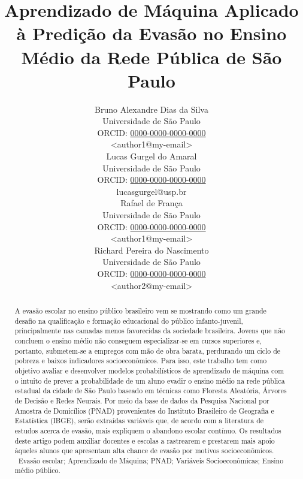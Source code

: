 \documentclass[english, spanish, brazilian]{RBIEarticle} %
\title{Aprendizado de Máquina Aplicado à Predição da Evasão no Ensino Médio da Rede Pública de São Paulo}
\author{%
	\parbox{3.8cm}{%
		Bruno Alexandre Dias da Silva\\
		Universidade de São Paulo\\
		ORCID: \href{https://orcid.org/0000-0000-0000-0000}{0000-0000-0000-0000}\\
		<author1@my-email>
	}
        \hspace{0.3cm}
	\parbox{3.8cm}{%
		Lucas Gurgel do Amaral\\
		Universidade de São Paulo\\
		ORCID: \href{https://orcid.org/0000-0000-0000-0000}{0000-0000-0000-0000}\\
		lucasgurgel@usp.br
	}
        \hspace{0.3cm}
        \parbox{3.8cm}{%
		Rafael de França\\
		Universidade de São Paulo\\
		ORCID: \href{https://orcid.org/0000-0000-0000-0000}{0000-0000-0000-0000}\\
		<author1@my-email>
	}
        \hspace{0.3cm}
	\parbox{3.9cm}{\raggedright%
		Richard Pereira do Nascimento\\
		Universidade de São Paulo\\
		ORCID: \href{https://orcid.org/0000-0000-0000-0000}{0000-0000-0000-0000}\\
		<author2@my-email>
	}
}
\begin{document}
\maketitle

\begin{otherlanguage}{brazilian}
\begin{abstract}
A evasão escolar no ensino público brasileiro vem se mostrando como um grande desafio na qualificação e formação educacional do público infanto-juvenil, principalmente nas camadas menos favorecidas da sociedade brasileira. Jovens que não concluem o ensino médio não conseguem especializar-se em cursos superiores e, portanto, submetem-se a empregos com mão de obra barata, perdurando um ciclo de pobreza e baixos indicadores socioeconômicos. Para isso, este trabalho tem como objetivo avaliar e desenvolver modelos probabilísticos de aprendizado de máquina com o intuito de prever a probabilidade de um aluno evadir o ensino médio na rede pública estadual da cidade de São Paulo baseado em técnicas como Floresta Aleatória, Árvores de Decisão e Redes Neurais. Por meio da base de dados da Pesquisa Nacional por Amostra de Domicílios (PNAD) provenientes do Instituto Brasileiro de Geografia e Estatística (IBGE), serão extraídas variáveis que, de acordo com a literatura de estudos acerca de evasão, mais expliquem o abandono escolar contínuo. Os resultados deste artigo podem auxiliar docentes e escolas a rastrearem e prestarem mais apoio àqueles alunos que apresentam alta chance de evasão por motivos socioeconômicos.  
\keywords\ Evasão escolar; Aprendizado de Máquina; PNAD; Variáveis Socioeconômicas; Ensino médio público.
\end{abstract}
\end{otherlanguage}
\end{document}
